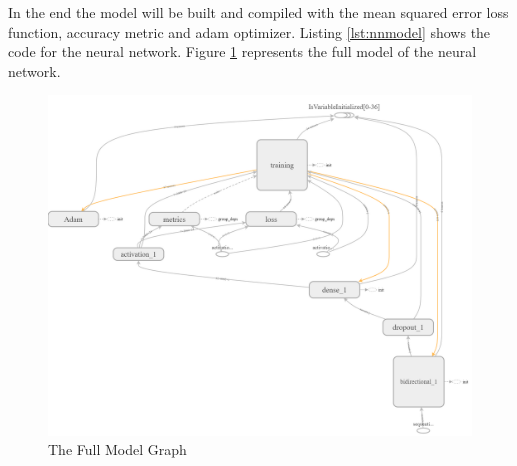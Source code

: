 In the end the model will be built and compiled with the mean  squared error loss function, accuracy metric and adam optimizer.
Listing \ref{lst:nnmodel} shows the code for the neural network. Figure \ref{fig:FullmodelGraph} represents the full model of the
neural network.
\begin{figure}[htp]
	\centering
	\includegraphics[width=1\textwidth]{Illustrations/tensorboardmodelofNN.png}
	\caption{The Full Model Graph}
	\label{fig:FullmodelGraph}
\end{figure}





